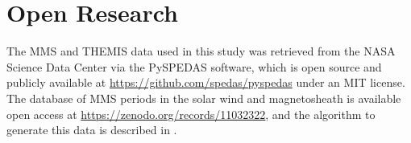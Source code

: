 

\section*{Open Research}
The MMS and THEMIS data \citep{Torbert:2016,Pollock:2016} used in this study was retrieved from the NASA Science Data Center via the PySPEDAS software, which is open source and publicly available at \url{https://github.com/spedas/pyspedas} under an MIT license. The \cite{ToyEdens:2024} database of MMS periods in the solar wind and magnetosheath is available open access at \url{https://zenodo.org/records/11032322}, and the algorithm to generate this data is described in \cite{ToyEdens2:2024}.